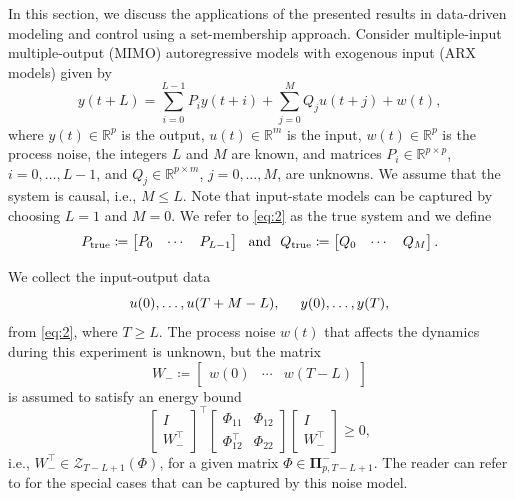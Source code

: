 \documentclass[pdflatex,sn-mathphys-num]{sn-jnl}%
\theoremstyle{thmstyleone}
\begin{document}
In this section, we discuss the applications of the presented results in data-driven modeling and control using a set-membership approach. Consider multiple-input multiple-output (MIMO) autoregressive models with exogenous input (ARX models) given by
\begin{equation}
\label{eq:2}
y(t+L)=\sum_{i=0}^{L-1}P_iy(t+i)+\sum_{j=0}^{M}Q_ju(t+j)+w(t),
\end{equation}
where $y(t)\in\mathbb{R}^p$ is the output, $u(t)\in\mathbb{R}^m$ is the input, $w(t)\in\mathbb{R}^p$ is the process noise, the integers $L$ and $M$ are known, and matrices $P_i\in\mathbb{R}^{p\times p}$, $i=0,\ldots,L-1$, and $Q_j\in\mathbb{R}^{p\times m}$, $j=0,\ldots,M$, are unknowns. We assume that the system is causal, i.e., $M\leq L$. Note that input-state models can be captured by choosing $L=1$ and $M=0$. We refer to \eqref{eq:2} as the true system and we define
\begin{equation}
P_\textup{true}\coloneqq\begin{bmatrix}
P_0 & \cdots & P_{L-1}
\end{bmatrix}\ \ \text{and}\ \  Q_\textup{true}\coloneqq\begin{bmatrix}
Q_0 & \cdots & Q_{M}
\end{bmatrix}.
\end{equation}

We collect the input-output data 
\begin{equation}
\label{eq:i-o-data}
u(0), \ldots, u(T+M-L),\hspace{0.5 cm} y(0), \ldots, y(T),
\end{equation}
from \eqref{eq:2}, where $T\geq L$. The process noise $w(t)$ that affects the dynamics during this experiment is unknown, but the matrix
\begin{equation*}
W_-\coloneqq\begin{bmatrix}
w(0) & \cdots & w(T-L)
\end{bmatrix}
\end{equation*}
is assumed to satisfy an energy bound
\begin{equation}
\label{eq:ass1-1}
\begin{bmatrix}
I \\ W_-^\top
\end{bmatrix}^\top \begin{bmatrix}
\Phi_{11} & \Phi_{12} \\
\Phi_{12}^\top & \Phi_{22}
\end{bmatrix} \begin{bmatrix}
I \\ W_-^\top
\end{bmatrix}\geq 0,
\end{equation}
i.e., $W_-^\top\in \mathcal{Z}_{T-L+1}(\Phi)$, for a given matrix $\Phi\in\pmb{\Pi}_{p,T-L+1}^-$. The reader can refer to \mbox{\cite[p. 4]{van2023quadratic}} for the special cases that can be captured by this noise model. 
\end{document}
